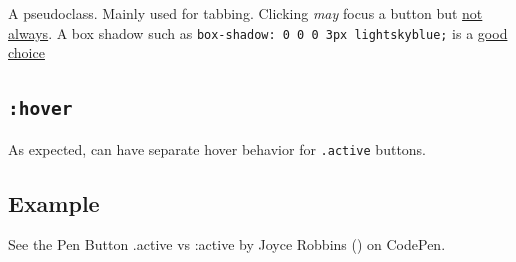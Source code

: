 \documentclass[
  openany]{book}
\begin{document}
A pseudoclass. Mainly used for tabbing. Clicking \emph{may} focus a button but \href{https://zellwk.com/blog/inconsistent-button-behavior/}{not always}. A box shadow such as \texttt{box-shadow:\ 0\ 0\ 0\ 3px\ lightskyblue;} is a \href{https://zellwk.com/blog/style-hover-focus-active-states/\#styling-focus-states}{good choice}

\hypertarget{hover}{%
\subsection{\texorpdfstring{\texttt{:hover}}{:hover}}\label{hover}}

As expected, can have separate hover behavior for \texttt{.active} buttons.

\hypertarget{example-3}{%
\subsection{Example}\label{example-3}}

{See the Pen
Button .active vs :active by Joyce Robbins (\citet{jtr13})
on CodePen.}

  
\end{document}
